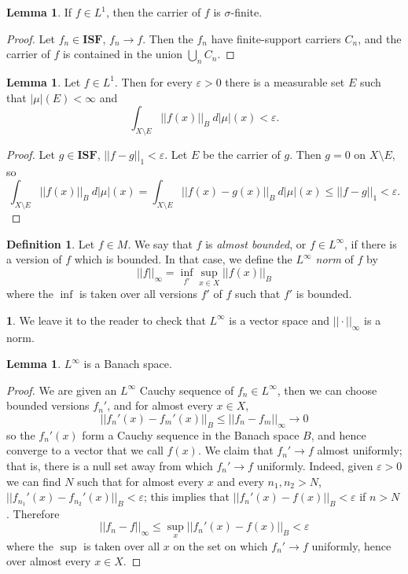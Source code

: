 \documentclass[12pt]{book}
\newcommand{\ISF}{\mathbf{ISF}}
\newcommand{\dfn}[1]{\emph{#1}\index{#1}}
\theoremstyle{definition}
\newtheorem{lemma}[theorem]{Lemma}
\newtheorem{subsec}[theorem]{}
\newtheorem{definition}[theorem]{Definition}
\begin{document}
\begin{lemma}
If $f \in L^1$, then the carrier of $f$ is $\sigma$-finite.
\end{lemma}
\begin{proof}
Let $f_n \in \ISF$, $f_n \to f$. Then the $f_n$ have finite-support carriers $C_n$, and the carrier of $f$ is contained in the union $\bigcup_n C_n$.
\end{proof}

\begin{lemma}
\label{L1 functions almost have finite carrier}
Let $f \in L^1$. Then for every $\varepsilon > 0$ there is a measurable set $E$ such that $|\mu|(E) < \infty$ and
$$\int_{X \setminus E} ||f(x)||_B ~d|\mu|(x) < \varepsilon.$$
\end{lemma}
\begin{proof}
Let $g \in \ISF$, $||f - g||_1 < \varepsilon$.
Let $E$ be the carrier of $g$. Then $g = 0$ on $X \setminus E$, so
$$\int_{X \setminus E} ||f(x)||_B ~d|\mu|(x) = \int_{X \setminus E} ||f(x) - g(x)||_B ~d|\mu|(x) \leq ||f - g||_1 < \varepsilon.$$
\end{proof}

\begin{definition}
Let $f \in M$. We say that $f$ is \dfn{almost bounded}, or $f \in L^\infty$, if there is a version of $f$ which is bounded.
In that case, we define the \dfn{$L^\infty$ norm} of $f$ by
$$||f||_\infty = \inf_{f'} \sup_{x \in X} ||f(x)||_B$$
where the $\inf$ is taken over all versions $f'$ of $f$ such that $f'$ is bounded.
\end{definition}

\begin{subsec}
We leave it to the reader to check that $L^\infty$ is a vector space and $||\cdot||_\infty$ is a norm.
\end{subsec}

\begin{lemma}
$L^\infty$ is a Banach space.
\end{lemma}
\begin{proof}
We are given an $L^\infty$ Cauchy sequence of $f_n \in L^\infty$, then we can choose bounded versions $f_n'$, and for almost every $x \in X$,
$$||f_n'(x) - f_m'(x)||_B \leq ||f_n - f_m||_\infty \to 0$$
so the $f_n'(x)$ form a Cauchy sequence in the Banach space $B$, and hence converge to a vector that we call $f(x)$.
We claim that $f_n' \to f$ almost uniformly; that is, there is a null set away from which $f_n' \to f$ uniformly.
Indeed, given $\varepsilon > 0$ we can find $N$ such that for almost every $x$ and every $n_1, n_2 > N$, $||f_{n_1}'(x) - f_{n_2}'(x)||_B < \varepsilon$; this implies that $||f_n'(x) - f(x)||_B < \varepsilon$ if $n > N$.
Therefore
$$||f_n - f||_\infty \leq \sup_x ||f_n'(x) - f(x)||_B < \varepsilon$$
where the $\sup$ is taken over all $x$ on the set on which $f_n' \to f$ uniformly, hence over almost every $x \in X$.
\end{proof}
\end{document}
